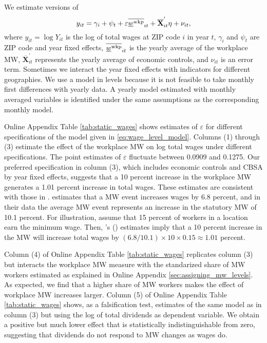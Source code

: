 We estimate versions of
\begin{equation}\label{eq:wage_level_model}
    y_{it} = \gamma_i + \psi_t + \varepsilon \overline{\underline{w}^{\text{wkp}}}_{it} + 
             \overline{\mathbf{X}}^{'}_{it} \eta + \nu_{it} ,
\end{equation}
where 
$y_{it} = \log Y_{it}$ is the log of total wages at ZIP code $i$ in year $t$,
$\gamma_i$ and $\psi_t$ are ZIP code and year fixed effects,
$\overline{\underline{w}^{\text{wkp}}}_{it}$ is the yearly average of the workplace MW,
$\overline{\mathbf{X}}^{'}_{it}$ represents the yearly average of economic 
controls, and
$\nu_{it}$ is an error term.
Sometimes we interact the year fixed effects with indicators for different
geographies.
We use a model in levels because it is not feasible to take monthly first 
differences with yearly data.
A yearly model estimated with monthly averaged variables is identified under the 
same assumptions as the corresponding monthly model.

Online Appendix Table \ref{tab:static_wages} shows estimates of $\varepsilon$ 
for different specifications of the model given in \eqref{eq:wage_level_model}.
Columns (1) through (3) estimate the effect of the workplace MW on log total
wages under different specifications.
The point estimates of $\varepsilon$ fluctuate between 0.0909 and 0.1275.
Our preferred specification in column (3), which includes
economic controls and CBSA by year fixed effects, suggests that a 10 percent 
increase in the workplace MW generates a 1.01 percent increase in total wages.
These estimates are consistent with those in \textcite{CegnizEtAl2019}.
\textcite[][Table I]{CegnizEtAl2019} estimates that a MW event increases wages
by 6.8 percent, and in their data the average MW event represents an increase in 
the statutory MW of 10.1 percent.
For illustration, assume that 15 percent of workers in a location earn the
minimum wage.
Then, \citeauthor{CegnizEtAl2019}'s (\citeyear{CegnizEtAl2019}) estimates imply 
that a 10 percent increase in the MW will increase total wages by 
$(6.8/10.1)\times 10\times 0.15 \approx 1.01$ percent.

Column (4) of Online Appendix Table \ref{tab:static_wages} replicates column (3)
but interacts the workplace MW measure with the standarized share of MW workers
estimated as explained in Online Appendix \ref{sec:assigning_mw_levels}.
As expected, we find that a higher share of MW workers makes the effect of
workplace MW increases larger.
Column (5) of Online Appendix Table \ref{tab:static_wages} shows, 
as a falsification test, 
estimates of the same model as in column (3) but using the log of total
dividends as dependent variable.
We obtain a positive but much lower effect that is statistically 
indistinguishable from zero, suggesting that dividends do not respond to 
MW changes as wages do.

